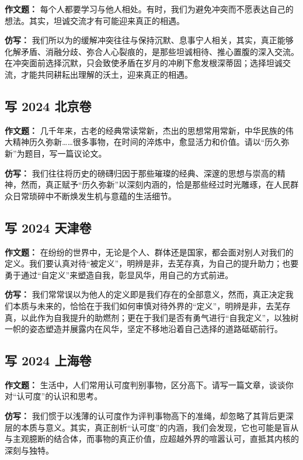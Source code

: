 \textbf{作文题：} 每个人都要学习与他人相处。有时，我们为避免冲突而不愿表达自己的想法。其实，坦诚交流才有可能迎来真正的相遇。

\textbf{仿写：} 我们所以为的缓解冲突往往与保持沉默、息事宁人相关，其实，真正能够化解矛盾、消融分歧、弥合人心裂痕的，是那些坦诚相待、推心置腹的深入交流。在冲突面前选择沉默，只会致使矛盾在岁月的冲刷下愈发根深蒂固；选择坦诚交流，才能共同耕耘出理解的沃土，迎来真正的相遇。


\subsection{写 2024 北京卷}

\textbf{作文题：} 几千年来，古老的经典常读常新，杰出的思想常用常新，中华民族的伟大精神历久弥新……很多事物，在时间的淬炼中，愈显活力和价值。请以“历久弥新”为题目，写一篇议论文。

\textbf{仿写：} 我们往往将历史的磅礴归因于那些璀璨的经典、深邃的思想与崇高的精神，然而，真正赋予“历久弥新”以深刻内涵的，恰是那些经过时光雕琢，在人民群众日常琐碎中不断焕发生机与意蕴的生活细节。


\subsection{写 2024 天津卷}

\textbf{作文题：} 在纷纷的世界中，无论是个人、群体还是国家，都会面对别人对我们的定义。我们要认真对待“被定义”，明辨是非，去芜存真，为自己的提升助力；也要勇于通过“自定义”来塑造自我，彰显风华，用自己的方式前进。

\textbf{仿写：} 我们常常误以为他人的定义即是我们存在的全部意义，然而，真正决定我们本质与未来的，恰恰在于我们如何审慎对待外界的“定义”，明辨是非，去芜存真，以此作为自我提升的助燃剂；更在于我们是否有勇气进行“自我定义”，以独树一帜的姿态塑造并展露内在风华，坚定不移地沿着自己选择的道路砥砺前行。


\subsection{写 2024 上海卷}

\textbf{作文题：} 生活中，人们常用认可度判别事物，区分高下。请写一篇文章，谈谈你对“认可度”的认识和思考。

\textbf{仿写：} 我们惯于以浅薄的认可度作为评判事物高下的准绳，却忽略了其背后更深层的本质与意义。其实，真正剖析“认可度”的内涵，我们会发现，它也可能是盲从与主观臆断的结合体，而事物的真正价值，应超越外界的喧嚣认可，直抵其内核的深刻与独特。
